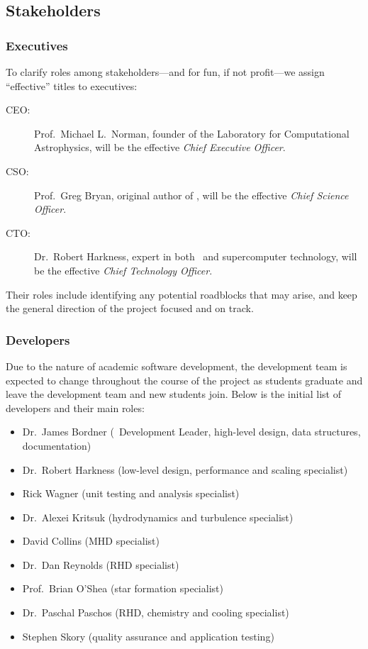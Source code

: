\documentclass[11pt]{article}
\begin{document}
\subsection{Stakeholders}

\subsubsection{Executives}

    To clarify roles among stakeholders---and for fun, if not
    profit---we assign ``effective'' titles to executives:

\begin{description}
%
    \item[CEO:]   Prof.~Michael L.~Norman, founder of the Laboratory for
    Computational Astrophysics, will be the effective \textit{Chief Executive Officer}.
%
    \item[CSO: ] Prof.~Greg Bryan, original author of \enzo, will be the
    effective \textit{Chief Science Officer}.
%
    \item[CTO: ] Dr.~Robert Harkness, expert in both \enzo\ and supercomputer
    technology, will be the effective \textit{Chief Technology
    Officer}.
%
\end{description}

   Their roles include identifying any potential roadblocks that may
   arise, and keep the general direction of the project focused and on
   track.

\subsubsection{Developers}

   Due to the nature of academic software development, the development
   team is expected to change throughout the course of the project as
   students graduate and leave the development team and new students
   join.  Below is the initial list of developers and their main roles:

\begin{itemize}
    \item Dr.~James Bordner (\cello\ Development Leader, high-level design, data structures, documentation)
    \item Dr.~Robert Harkness (low-level design, performance and scaling specialist)
    \item Rick Wagner (unit testing and analysis specialist)
    \item Dr.~Alexei Kritsuk (hydrodynamics and turbulence specialist)
    \item David Collins (MHD specialist)
    \item Dr.~Dan Reynolds (RHD specialist)
    \item Prof.~Brian O'Shea (star formation specialist)
    \item Dr.~Paschal Paschos (RHD, chemistry and cooling specialist)
    \item Stephen Skory (quality assurance and application testing)
\end{itemize}
\end{document}
